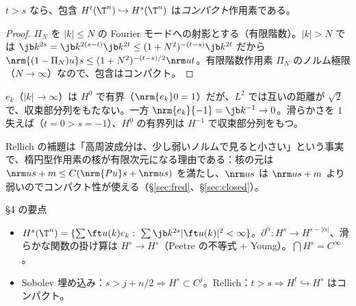 \begin{thm}\label{thm:rellich}\tP
$t>s$ なら、包含 $H^t(\T^n)\hookrightarrow H^s(\T^n)$ は\emph{コンパクト}作用素である。
\end{thm}
\begin{proof}
$\Pi_N$ を $|k|\le N$ の Fourier モードへの射影とする（有限階数）。$|k|>N$ では $\jb k^{2s}=\jb k^{2(s-t)}\jb k^{2t}\le(1+N^2)^{-(t-s)}\jb k^{2t}$ だから $\nrm{(1-\Pi_N)u}s\le(1+N^2)^{-(t-s)/2}\nrm ut$。有限階数作用素 $\Pi_N$ のノルム極限（$N\to\infty$）なので、包含はコンパクト。
\end{proof}
\begin{ex}
$e_k$（$|k|\to\infty$）は $H^0$ で有界（$\nrm{e_k}0=1$）だが、$L^2$ では互いの距離が $\sqrt2$ で、収束部分列をもたない。一方 $\nrm{e_k}{-1}=\jb k^{-1}\to0$。滑らかさを $1$ 失えば（$t=0>s=-1$）、$H^0$ の有界列は $H^{-1}$ で収束部分列をもつ。
\end{ex}
\begin{rem}[この節の使い方]
Rellich の補題は「高周波成分は、少し弱いノルムで見ると小さい」という事実で、楕円型作用素の核が有限次元になる理由である：核の元は $\nrm u{s+m}\le C(\nrm{Pu}s+\nrm us)$ を満たし、$\nrm us$ は $\nrm u{s+m}$ より弱いのでコンパクト性が使える（\S\ref{sec:fred}、\S\ref{sec:closed}）。
\end{rem}
\begin{keybox}{§4 の要点}
\begin{itemize}
\item $H^s(\T^n)=\{\sum\ft u(k)e_k:\ \sum\jb k^{2s}|\ft u(k)|^2<\infty\}$。$\partial^\alpha:H^s\to H^{s-|\alpha|}$、滑らかな関数の掛け算は $H^s\to H^s$（Peetre の不等式 $+$ Young）。$\bigcap H^s=C^\infty$。
\item Sobolev 埋め込み：$s>j+n/2\Rightarrow H^s\subset C^j$。Rellich：$t>s\Rightarrow H^t\hookrightarrow H^s$ はコンパクト。
\end{itemize}
\end{keybox}
